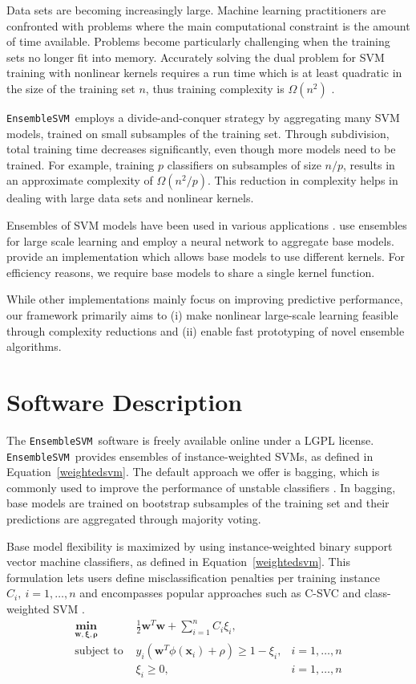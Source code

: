 \documentclass[twoside,11pt]{article}
\newcommand{\esvm}{\texttt{\selectfont EnsembleSVM}}
\begin{document}
Data sets are becoming increasingly large. Machine learning practitioners are confronted with
problems where the main computational constraint is the amount of time available. Problems become particularly challenging when
the training sets no longer fit into memory. Accurately solving the dual problem
for SVM training with nonlinear kernels requires a run time which is at least
quadratic in the size of the training set $n$, thus training complexity is $\Omega(n^2)$
\citep{bottou07svm,NL09a}.

\esvm\ employs a divide-and-conquer strategy by aggregating many SVM models,
trained on small subsamples of the training set. 
Through subdivision, total training time decreases significantly, even though
more models need to be trained. For example, training $p$
classifiers on subsamples of size $n/p$, results in an approximate complexity
of $\Omega(n^2/p)$. This reduction in complexity helps in dealing
with large data sets and nonlinear kernels.


Ensembles of SVM models have been used in various applications
\citep{Wang20096466,5646323,mordelet2011prodige}.
\citet{Collobert02} use ensembles for large scale learning and employ a neural
network to aggregate base models.
\citet{Valentini03lowbias} provide an implementation which allows base models to use different kernels.
For efficiency reasons, we require base models to share a single kernel function. 

While other implementations mainly focus on improving predictive performance, our framework
primarily aims to (i) make nonlinear large-scale learning feasible through complexity reductions and (ii) enable fast prototyping of novel ensemble algorithms.

\section{Software Description}
The \esvm\ software is freely available online under a
LGPL license. \esvm\ provides ensembles of
instance-weighted SVMs, as defined in Equation~\eqref{weightedsvm}.
The default approach we offer is bagging, which is commonly used to improve the
performance of unstable classifiers \citep{Breiman:1996:BP:231986.231989}. In
bagging, base models are trained on bootstrap subsamples of the training set
and their predictions are aggregated through majority voting.

Base model flexibility is maximized by using instance-weighted binary support
vector machine classifiers, as defined in Equation~\eqref{weightedsvm}. This formulation lets users define
misclassification penalties per training instance $C_i,\ i=1,\ldots,n$ and
encompasses popular approaches such as C-SVC and class-weighted SVM
\citep{Cortes:1995:SN:218919.218929, osuna1997}.
\begin{align}
\mathbf{\min_{\mathbf{w},\mathbf{\xi},\rho} } \ &
\frac{1}{2}\mathbf{w}^T\mathbf{w}+\sum_{i=1}^n C_i \xi_i,
\label{weightedsvm} \\
\text{subject\ to }  &y_i(\mathbf{w}^T\phi(\mathbf{x}_i)+\rho)\geq 1-\xi_i,
&i=1,\ldots,n \nonumber \\
&\xi_i \geq 0, &i=1,\ldots,n \nonumber  
\end{align}
\end{document}
